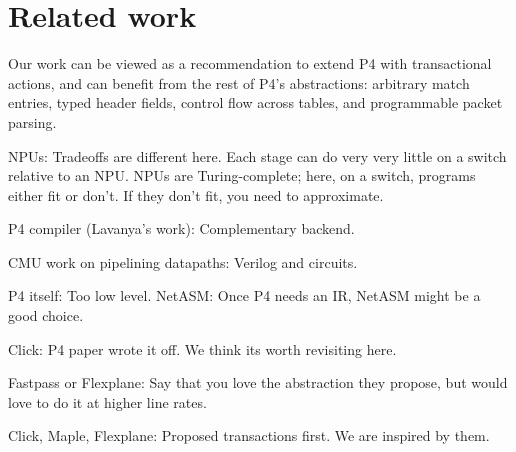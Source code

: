\section{Related work}
\label{s:related}
Our work can be viewed
as a recommendation to extend P4 with transactional actions, and can benefit
from the rest of P4's abstractions: arbitrary match entries, typed header
fields, control flow across tables, and programmable packet parsing.


NPUs: Tradeoffs are different here. Each stage can do very very little on a switch relative to an NPU. NPUs are Turing-complete; here, on a switch, programs either fit or don't. If they don't fit, you need to approximate.

P4 compiler (Lavanya's work): Complementary backend.

CMU work on pipelining datapaths: Verilog and circuits.

P4 itself: Too low level. NetASM: Once P4 needs an IR, NetASM might be a good choice.

Click: P4 paper wrote it off. We think its worth revisiting here.

Fastpass or Flexplane: Say that you love the abstraction they propose,
but would love to do it at higher line rates.

Click, Maple, Flexplane: Proposed transactions first. We are inspired by them.
